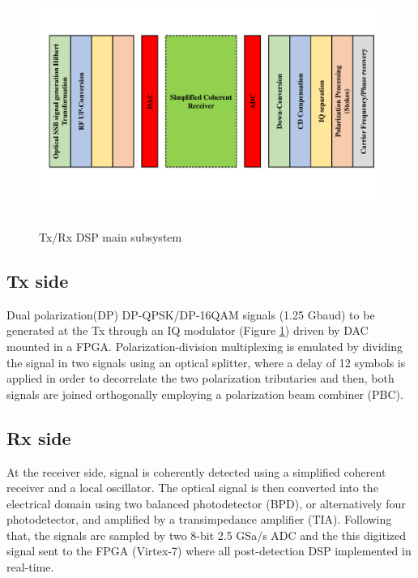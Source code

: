\begin{figure}[h]
	\centering
	\includegraphics[width=1.0\textwidth, height=8cm]{./sdf/simplified_coherent_receiver/figures/detailed_subsystem.pdf}
	\caption{Tx/Rx DSP main subsystem}\label{DSP_main_subsystem}
\end{figure}

\subsection{Tx side}
Dual polarization(DP) DP-QPSK/DP-16QAM signals (1.25 Gbaud) to be generated at the Tx through an IQ modulator (Figure \ref{DSP_main_subsystem}) driven by DAC mounted in a FPGA. Polarization-division multiplexing is emulated by dividing the signal in two signals using an optical splitter, where a delay of 12 symbols is applied in order to decorrelate the two polarization tributaries and then, both signals are joined orthogonally employing a polarization beam combiner (PBC).

\subsection{Rx side}
At the receiver side, signal is coherently detected using a simplified coherent receiver and a local oscillator. The optical signal is then converted into the electrical domain using two balanced photodetector (BPD), or alternatively four photodetector, and amplified by a transimpedance amplifier (TIA). Following that, the signals are sampled by two 8-bit 2.5 GSa/s ADC and the this digitized signal sent to the FPGA (Virtex-7) where all post-detection DSP implemented in real-time.


%	
%	
